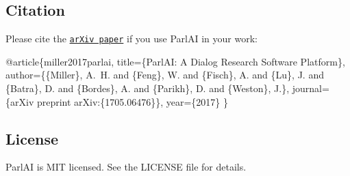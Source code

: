 \subsection*{Citation}

Please cite the \href{https://arxiv.org/abs/1705.06476}{\tt ar\+Xiv paper} if you use Parl\+AI in your work\+:


\begin{DoxyCode}
@article\{miller2017parlai,
  title=\{ParlAI: A Dialog Research Software Platform\},
  author=\{\{Miller\}, A.~H. and \{Feng\}, W. and \{Fisch\}, A. and \{Lu\}, J. and \{Batra\}, D. and \{Bordes\}, A. and
       \{Parikh\}, D. and \{Weston\}, J.\},
  journal=\{arXiv preprint arXiv:\{1705.06476\}\},
  year=\{2017\}
\}
\end{DoxyCode}


\subsection*{License}

Parl\+AI is M\+IT licensed. See the L\+I\+C\+E\+N\+SE file for details. 